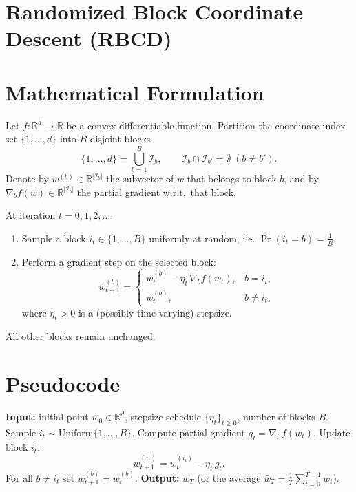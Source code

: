\documentclass{article}
\newcommand{\R}{\mathbb{R}}
\begin{document}
\section*{Randomized Block Coordinate Descent (RBCD)}

\section*{Mathematical Formulation}
Let $f:\R^{d}\rightarrow\R$ be a convex differentiable function.  
Partition the coordinate index set $\{1,\dots ,d\}$ into $B$ disjoint blocks
\[
\{1,\dots ,d\}= \bigcup_{b=1}^{B} \mathcal{I}_{b},\qquad 
\mathcal{I}_{b}\cap \mathcal{I}_{b'}=\emptyset\;(b\neq b').
\]
Denote by $w^{(b)}\in\R^{|\mathcal{I}_{b}|}$ the subvector of $w$ that belongs to block $b$, and by
$\nabla_{b}f(w)\in\R^{|\mathcal{I}_{b}|}$ the partial gradient w.r.t.\ that block.

At iteration $t=0,1,2,\dots$:
\begin{enumerate}[label=\arabic*)]
\item Sample a block $i_{t}\in\{1,\dots ,B\}$ uniformly at random,
      i.e. $\Pr(i_{t}=b)=\frac{1}{B}$.
\item Perform a gradient step on the selected block:
\[
w_{t+1}^{(b)}=
\begin{cases}
w_{t}^{(b)}-\eta_{t}\,\nabla_{b}f(w_{t}), & b=i_{t},\\[4pt]
w_{t}^{(b)}, & b\neq i_{t},
\end{cases}
\tag{1}
\]
where $\eta_{t}>0$ is a (possibly time‑varying) stepsize.
\end{enumerate}
All other blocks remain unchanged.  

\section*{Pseudocode}
\begin{algorithm}[H]
\caption{Randomized Block Coordinate Descent}
\begin{algorithmic}[1]
\State \textbf{Input:} initial point $w_{0}\in\R^{d}$, stepsize schedule $\{\eta_{t}\}_{t\ge0}$, number of blocks $B$.
    \State Sample $i_{t}\sim\text{Uniform}\{1,\dots ,B\}$.
    \State Compute partial gradient $g_{t}= \nabla_{i_{t}}f(w_{t})$.
    \State Update block $i_{t}$:
    \[
    w_{t+1}^{(i_{t})}= w_{t}^{(i_{t})}-\eta_{t}\,g_{t}.
    \]
    \State For all $b\neq i_{t}$ set $w_{t+1}^{(b)}=w_{t}^{(b)}$.
\EndFor
\State \textbf{Output:} $w_{T}$ (or the average $\bar w_{T}=\frac1T\sum_{t=0}^{T-1}w_{t}$).
\end{algorithmic}
\end{algorithm}
\end{document}
